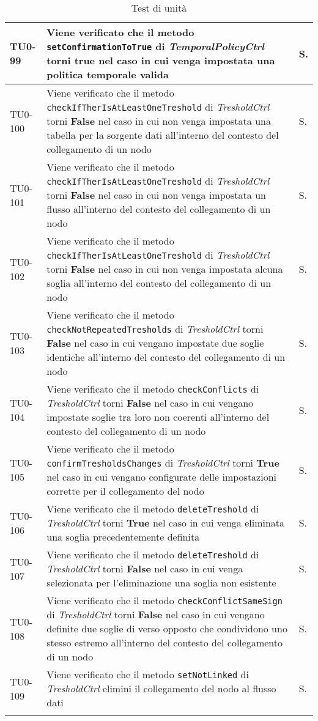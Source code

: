 \begin{longtable}{|C{.15\textwidth}|m{.66\textwidth}|C{.10\textwidth}|}
\hline
TU0-99 & Viene verificato che il metodo \texttt{setConfirmationToTrue} di \textit{TemporalPolicyCtrl} torni \textbf{true} nel caso in cui venga impostata una politica temporale valida & S.\\
\hline
{}TU0-100 & Viene verificato che il metodo \texttt{checkIfTherIsAtLeastOneTreshold} di \textit{TresholdCtrl} torni \textbf{False} nel caso in cui non venga impostata una tabella per la sorgente dati all'interno del contesto del collegamento di un nodo & S.\\
\hline
TU0-101 & Viene verificato che il metodo \texttt{checkIfTherIsAtLeastOneTreshold} di \textit{TresholdCtrl} torni \textbf{False} nel caso in cui non venga impostata un flusso all'interno del contesto del collegamento di un nodo & S.\\
\hline
{}TU0-102 & Viene verificato che il metodo \texttt{checkIfTherIsAtLeastOneTreshold} di \textit{TresholdCtrl} torni \textbf{False} nel caso in cui non venga impostata alcuna soglia all'interno del contesto del collegamento di un nodo & S.\\
\hline
TU0-103 & Viene verificato che il metodo \texttt{checkNotRepeatedTresholds} di \textit{TresholdCtrl} torni \textbf{False} nel caso in cui vengano impostate due soglie identiche all'interno del contesto del collegamento di un nodo & S.\\
\hline
{}TU0-104 & Viene verificato che il metodo \texttt{checkConflicts} di \textit{TresholdCtrl} torni \textbf{False} nel caso in cui vengano impostate soglie tra loro non coerenti all'interno del contesto del collegamento di un nodo & S.\\
\hline
TU0-105 & Viene verificato che il metodo \texttt{confirmTresholdsChanges} di \textit{TresholdCtrl} torni \textbf{True} nel caso in cui vengano configurate delle impostazioni corrette per il collegamento del nodo & S.\\
\hline
{}TU0-106 & Viene verificato che il metodo \texttt{deleteTreshold} di \textit{TresholdCtrl} torni \textbf{True} nel caso in cui venga eliminata una soglia precedentemente definita & S.\\
\hline
TU0-107 & Viene verificato che il metodo \texttt{deleteTreshold} di \textit{TresholdCtrl} torni \textbf{False} nel caso in cui venga selezionata per l'eliminazione una soglia non esistente & S.\\
\hline
{}TU0-108 & Viene verificato che il metodo \texttt{checkConflictSameSign} di \textit{TresholdCtrl} torni \textbf{False} nel caso in cui vengano definite due soglie di verso opposto che condividono uno stesso estremo all'interno del contesto del collegamento di un nodo & S.\\
\hline
TU0-109 & Viene verificato che il metodo \texttt{setNotLinked} di \textit{TresholdCtrl} elimini il collegamento del nodo al flusso dati & S.\\
\hline
\caption{Test di unità}
\label{testunita}
\end{longtable}



